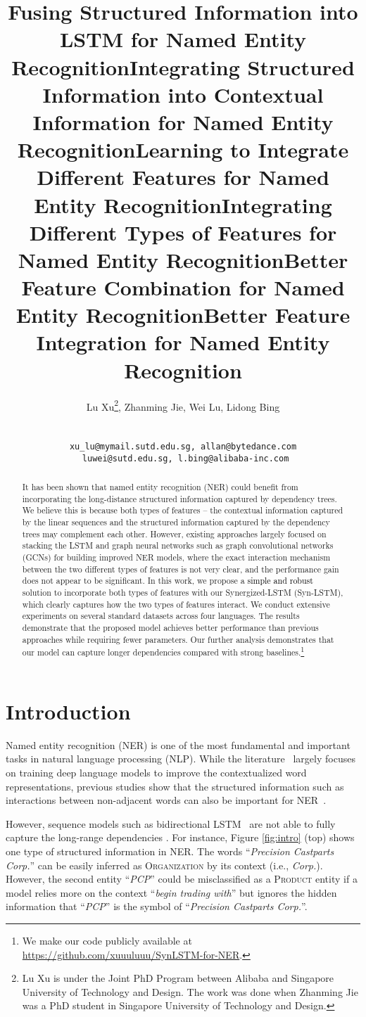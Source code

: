 \documentclass[11pt]{article}
\title{Fusing Structured Information into LSTM for Named Entity Recognition}
\title{Integrating Structured Information into Contextual Information for Named Entity Recognition}
\title{Learning to Integrate Different Features for Named Entity Recognition}
\title{Integrating Different Types of Features for Named Entity Recognition}
\title{Better Feature Combination for Named Entity Recognition}
\title{Better Feature Integration for Named Entity Recognition}
\author{Lu Xu\affmark[1, 2]\thanks{  Lu Xu is under the Joint PhD Program between Alibaba and Singapore University of Technology and Design. The work was done when Zhanming Jie was a PhD student in Singapore University of Technology and Design.},
Zhanming Jie\affmark[1, 3], Wei Lu\affmark[1], Lidong Bing\affmark[2]\\
\affaddr{\affmark[1] StatNLP Research Group, Singapore University of Technology and Design}\\
\affaddr{\affmark[2] DAMO Academy, Alibaba Group}~~ \affaddr{\affmark[3] ByteDance}\\
\tt{xu\_lu@mymail.sutd.edu.sg, allan@bytedance.com}\\
\tt{ luwei@sutd.edu.sg, l.bing@alibaba-inc.com}\\
}
\begin{document}
\maketitle
\begin{abstract}


It {\color{black}has been} shown that named entity recognition (NER) could benefit from incorporating the long-distance structured information captured by dependency trees.
We believe this is because both types of features -- the contextual information captured by the linear sequences and the structured information captured by the dependency trees may complement each other.
However, existing approaches largely focused on stacking the LSTM and graph neural networks such as graph convolutional networks (GCNs) for building improved NER models,
where the exact interaction mechanism between the two {\color{black}different} types of features is not very clear, and the performance gain does not appear to be significant.
In this work, we propose a \textcolor{black}{simple and robust} solution to incorporate both types of features with our Synergized-LSTM (Syn-LSTM), which clearly captures how the two types of features interact.
We conduct extensive experiments on several standard datasets across four languages.
The results demonstrate that the proposed model achieves better performance than previous approaches while requiring fewer parameters.
Our further analysis demonstrates that our model can capture longer dependencies compared with  strong baselines.\footnote{We make our code publicly available at \url{https://github.com/xuuuluuu/SynLSTM-for-NER}.}
\end{abstract}





\section{Introduction}
Named entity recognition (NER) is one of the most fundamental and important tasks in natural language processing (NLP). 
While  the literature~\cite{peters2018deep,akbik2018coling,devlin2019bert} largely focuses on training deep language models to improve the contextualized word representations, previous studies show that the structured information such as interactions between {\color{black}non-adjacent} words can also be important for NER~\cite{finkel-etal-2005-incorporating,jie2017efficient,aguilar2019dependency}. 

However, sequence models such as bidirectional LSTM~\cite{lstm} are not able to fully capture the long-range dependencies \cite{bengio2009learning}.
For instance, Figure \ref{fig:intro} (top) shows one type of structured information in NER.
The words ``{\it Precision Castparts Corp.}'' can be easily inferred as \textsc{Organization} by its context (i.e., \textit{Corp.}). 
{\color{black}However}, the second entity ``{\it PCP}'' could be misclassified as a \textsc{Product} entity if a model relies more on the context ``\textit{begin trading with}'' but ignores the hidden information that ``{\it PCP}'' is the symbol of ``{\it Precision Castparts Corp.}''. 
\end{document}
